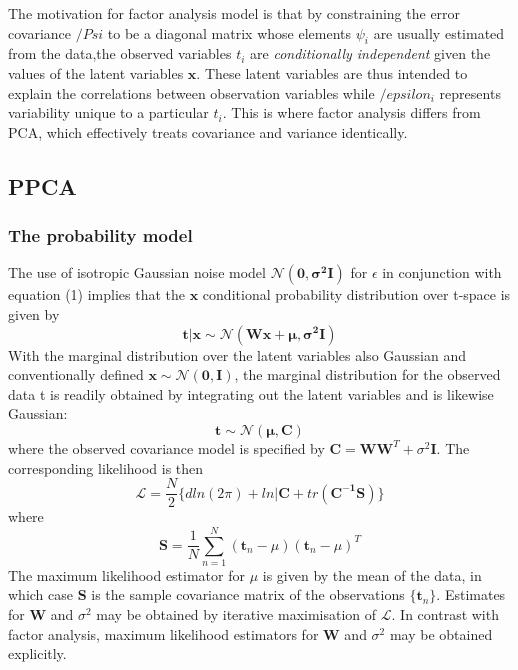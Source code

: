 \documentclass[ %
                    author={Dillon Keith Diep},
                supervisor={Dr. Carl Henrik Ek},
                    degree={MEng},
                     title={Assisted Content Generation for 3D Hair Geometry},
                  subtitle={[INCOMPLETE DRAFT, CONTAINS NOTES FROM RESEARCH]},
                      type={Research},
                      year={2014} ]{dissertation}
\begin{document}
The motivation for factor analysis model is that by constraining the error covariance $/Psi$ to be a diagonal matrix whose elements $\psi_i$ are usually estimated from the data,the observed variables $t_i$ are \textit{conditionally independent} given the values of the latent variables $\mathbf{x}$. These latent variables are thus intended to explain the correlations between observation variables while $/epsilon_i$ represents variability unique to a particular $t_i$. This is where factor analysis differs from PCA, which effectively treats covariance and variance identically.

\subsection{PPCA}
\subsubsection{The probability model}
The use of isotropic Gaussian noise model $\mathcal{N}(\mathbf{0,\sigma^2I})$ for $\epsilon$ in conjunction with equation (1) implies that the $\mathbf{x}$ conditional probability distribution over t-space is given by 
\begin{equation}
	\mathbf{t|x\sim\mathcal{N}(Wx+\mu,\sigma^2I)}
\end{equation}
With the marginal distribution over the latent variables also Gaussian and conventionally defined $\mathbf{x\sim\mathcal{N}(0,I)}$, the marginal distribution for the observed data t is readily obtained by integrating out the latent variables and is likewise Gaussian:
\begin{equation}
	\mathbf{t\sim\mathcal{N}(\mu,C)}
\end{equation}
where the observed covariance model is specified by $\mathbf{C=WW}^T+\sigma^2\mathbf{I}$.
The corresponding likelihood is then
\begin{equation}
	\mathcal{L}=\frac{N}{2}\{d ln(2\pi)+ln|\mathbf{C}+tr(\mathbf{C^{-1}S})\}
\end{equation}
where
\begin{equation}
	\mathbf{S}=\frac{1}{N}\sum^N_{n=1}(\mathbf{t}_n-\mu)(\mathbf{t}_n-\mu)^T
\end{equation}
The maximum likelihood estimator for $\mu$ is given by the mean of the data, in which case $\mathbf{S}$ is the sample covariance matrix of the observations $\{\mathbf{t}_n\}$. Estimates for $\mathbf{W}$ and $\sigma^2$ may be obtained by iterative maximisation of $\mathcal{L}$. In contrast with factor analysis, maximum likelihood estimators for $\mathbf{W}$ and $\sigma^2$ may be obtained explicitly.
\end{document}
